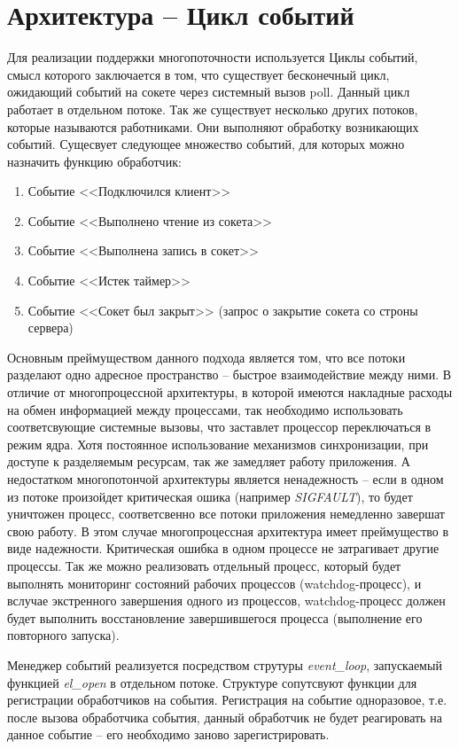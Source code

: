 \documentclass[a4paper,12pt]{report}
\begin{document}
	 \section{Архитектура -- Цикл событий}

    Для реализации поддержки многопоточности используется Циклы событий, смысл которого заключается в том, что существует бесконечный цикл, ожидающий событий на сокете через системный вызов poll. Данный цикл работает в отдельном потоке. Так же существует несколько других потоков, которые называются работниками. Они выполняют обработку возникающих событий. Сущесвует следующее множество событий, для которых можно назначить функцию обработчик:
    \begin{enumerate}
        \item Событие <<Подключился клиент>>
        \item Событие <<Выполнено чтение из сокета>>
        \item Событие <<Выполнена запись в сокет>>
        \item Событие <<Истек таймер>>
        \item Событие <<Сокет был закрыт>> (запрос о закрытие сокета со строны сервера)
    \end{enumerate}
    
    Основным преймуществом данного подхода является том, что все потоки разделают одно адресное пространство -- быстрое взаимодействие между ними. В отличие от многопроцессной архитектуры, в которой имеются накладные расходы на обмен информацией между процессами, так необходимо использовать соответсвующие системные вызовы, что заставлет процессор переключаться в режим ядра. Хотя постоянное использование механизмов синхронизации, при доступе к разделяемым ресурсам, так же замедляет работу приложения. А недостатком многопотончой архитектуры является ненадежность -- если в одном из потоке произойдет критическая ошика (например \textit{SIGFAULT}), то будет уничтожен процесс, соответсвенно все потоки приложения немедленно завершат свою работу. В этом случае многопроцессная архитектура имеет преймущество в виде надежности. Критическая ошибка в одном процессе не затрагивает другие процессы. Так же можно реализовать отдельный процесс, который будет выполнять мониторинг состояний рабочих процессов (watchdog-процесс), и вслучае экстренного завершения одного из процессов, watchdog-процесс должен будет выполнить восстановление завершившегося процесса (выполнение его повторного запуска). 
    
    Менеджер событий реализуется посредством струтуры \textit{event\_loop}, запускаемый функцией \textit{el\_open} в отдельном потоке. Структуре сопутсвуют функции для регистрации обработчиков на события. Регистрация на событие одноразовое, т.е. после вызова обработчика события, данный обработчик не будет реагировать на данное событие -- его необходимо заново зарегистрировать. 
    
\end{document}
